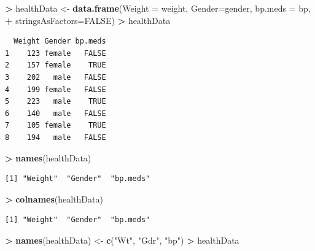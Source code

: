 \documentclass[]{krantz}
\makeatletter
\newenvironment{Shaded}{\begin{snugshade}}{\end{snugshade}}
\newcommand{\DataTypeTok}[1]{\textcolor[rgb]{0.27,0.27,0.27}{#1}}
\newcommand{\KeywordTok}[1]{\textcolor[rgb]{0.27,0.27,0.27}{\textbf{#1}}}
\newcommand{\NormalTok}[1]{#1}
\newcommand{\OperatorTok}[1]{\textcolor[rgb]{0.43,0.43,0.43}{\textbf{#1}}}
\newcommand{\OtherTok}[1]{\textcolor[rgb]{0.37,0.37,0.37}{#1}}
\newcommand{\StringTok}[1]{\textcolor[rgb]{0.5,0.5,0.5}{#1}}
\newenvironment{kframe}{%
\medskip{}
\setlength{\fboxsep}{.8em}
 \def\at@end@of@kframe{}%
 \ifinner\ifhmode%
  \def\at@end@of@kframe{\end{minipage}}%
  \begin{minipage}{\columnwidth}%
 \fi\fi%
 \def\FrameCommand##1{\hskip\@totalleftmargin \hskip-\fboxsep
 \colorbox{shadecolor}{##1}\hskip-\fboxsep
     \hskip-\linewidth \hskip-\@totalleftmargin \hskip\columnwidth}%
 \MakeFramed {\advance\hsize-\width
   \@totalleftmargin\z@ \linewidth\hsize
   \@setminipage}}%
 {\par\unskip\endMakeFramed%
 \at@end@of@kframe}
\renewenvironment{Shaded}{\begin{kframe}}{\end{kframe}}
\makeatother
\begin{document}
\begin{Shaded}
\begin{Highlighting}[]
\OperatorTok{>}\StringTok{ }\NormalTok{healthData <-}\StringTok{ }\KeywordTok{data.frame}\NormalTok{(}\DataTypeTok{Weight =}\NormalTok{ weight, }\DataTypeTok{Gender=}\NormalTok{gender, }\DataTypeTok{bp.meds =}\NormalTok{ bp,}
\OperatorTok{+}\StringTok{                          }\DataTypeTok{stringsAsFactors=}\OtherTok{FALSE}\NormalTok{)}
\OperatorTok{>}\StringTok{ }\NormalTok{healthData}
\end{Highlighting}
\end{Shaded}

\begin{verbatim}
  Weight Gender bp.meds
1    123 female   FALSE
2    157 female    TRUE
3    202   male   FALSE
4    199 female   FALSE
5    223   male    TRUE
6    140   male   FALSE
7    105 female    TRUE
8    194   male   FALSE
\end{verbatim}

\begin{Shaded}
\begin{Highlighting}[]
\OperatorTok{>}\StringTok{ }\KeywordTok{names}\NormalTok{(healthData)}
\end{Highlighting}
\end{Shaded}

\begin{verbatim}
[1] "Weight"  "Gender"  "bp.meds"
\end{verbatim}

\begin{Shaded}
\begin{Highlighting}[]
\OperatorTok{>}\StringTok{ }\KeywordTok{colnames}\NormalTok{(healthData)}
\end{Highlighting}
\end{Shaded}

\begin{verbatim}
[1] "Weight"  "Gender"  "bp.meds"
\end{verbatim}

\begin{Shaded}
\begin{Highlighting}[]
\OperatorTok{>}\StringTok{ }\KeywordTok{names}\NormalTok{(healthData) <-}\StringTok{ }\KeywordTok{c}\NormalTok{(}\StringTok{"Wt"}\NormalTok{, }\StringTok{"Gdr"}\NormalTok{, }\StringTok{"bp"}\NormalTok{)}
\OperatorTok{>}\StringTok{ }\NormalTok{healthData}
\end{Highlighting}
\end{Shaded}
\end{document}

